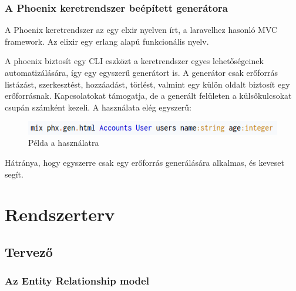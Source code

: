 \documentclass[a4paper,12pt,oneside]{report}
\begin{document}
\newpage
\subsubsection{A Phoenix keretrendszer beépített generátora}

\begin{justify}
	A Phoenix keretrendszer az egy elxir nyelven írt, a laravelhez hasonló MVC framework. Az elixir egy erlang alapú funkcionális nyelv. 

	A phoenix biztosít egy CLI eszközt a keretrendszer egyes lehetőségeinek automatizálására, így egy egyszerű generátort is. A generátor csak erőforrás listázást, szerkesztést, hozzáadást, törlést, valmint egy külön oldalt biztosít egy erőforrásnak. Kapcsolatokat támogatja, de a generált felületen a külsőkulcsokat csupán számként kezeli. A használata elég egyszerű: 

	\begin{figure}[h]
		\includegraphics[width=\textwidth]{contents/images/mix_phx_gen_html.png}
		\caption{Példa a használatra}
		\label{fig:mix_phx_gen_html}
	\end{figure}

	Hátránya, hogy egyszerre csak egy erőforrás generálására alkalmas, és keveset segít.

\end{justify}

\newpage
\section{Rendszerterv}
\subsection{Tervező}
\subsubsection{Az Entity Relationship model}
\end{document}
